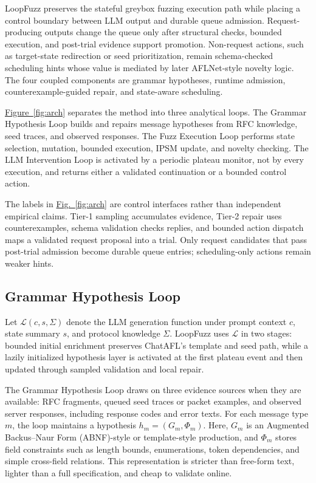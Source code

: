 \documentclass[final,5p,times,number]{elsarticle}
\newcommand{\figref}[1]{\hyperref[#1]{Fig.~\ref*{#1}}}
\newcommand{\figureref}[1]{\hyperref[#1]{Figure~\ref*{#1}}}
\begin{document}
LoopFuzz preserves the stateful greybox fuzzing execution path while placing a control boundary between LLM output and durable queue admission. Request-producing outputs change the queue only after structural checks, bounded execution, and post-trial evidence support promotion. Non-request actions, such as target-state redirection or seed prioritization, remain schema-checked scheduling hints whose value is mediated by later AFLNet-style novelty logic. The four coupled components are grammar hypotheses, runtime admission, counterexample-guided repair, and state-aware scheduling.

\figureref{fig:arch} separates the method into three analytical loops. The Grammar Hypothesis Loop builds and repairs message hypotheses from RFC knowledge, seed traces, and observed responses. The Fuzz Execution Loop performs state selection, mutation, bounded execution, IPSM update, and novelty checking. The LLM Intervention Loop is activated by a periodic plateau monitor, not by every execution, and returns either a validated continuation or a bounded control action.

The labels in \figref{fig:arch} are control interfaces rather than independent empirical claims. Tier-1 sampling accumulates evidence, Tier-2 repair uses counterexamples, schema validation checks replies, and bounded action dispatch maps a validated request proposal into a trial. Only request candidates that pass post-trial admission become durable queue entries; scheduling-only actions remain weaker hints.

\subsection{Grammar Hypothesis Loop}
Let $\mathcal{L}(c, s, \Sigma)$ denote the LLM generation function under prompt context $c$, state summary $s$, and protocol knowledge $\Sigma$. LoopFuzz uses $\mathcal{L}$ in two stages: bounded initial enrichment preserves ChatAFL's template and seed path, while a lazily initialized hypothesis layer is activated at the first plateau event and then updated through sampled validation and local repair.

The Grammar Hypothesis Loop draws on three evidence sources when they are available: RFC fragments, queued seed traces or packet examples, and observed server responses, including response codes and error texts. For each message type $m$, the loop maintains a hypothesis $h_m=(G_m,\Phi_m)$. Here, $G_m$ is an Augmented Backus--Naur Form (ABNF)-style or template-style production, and $\Phi_m$ stores field constraints such as length bounds, enumerations, token dependencies, and simple cross-field relations. This representation is stricter than free-form text, lighter than a full specification, and cheap to validate online.
\end{document}
